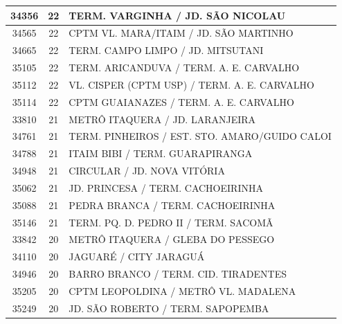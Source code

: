 \documentclass[
	12pt,				%
	oneside,			%
	a4paper,			%
	english,			%
	brazil				%
	]{abntex2ppgsi}
\begin{document}
\begin{apendicesenv}
\begin{longtable}{c|c|p{7cm}}
    34356 & 22    & TERM. VARGINHA / JD. SÃO NICOLAU \\
\hline

    34565 & 22    & CPTM VL. MARA/ITAIM / JD. SÃO MARTINHO \\
\hline

    34665 & 22    & TERM. CAMPO LIMPO / JD. MITSUTANI \\
\hline

    35105 & 22    & TERM. ARICANDUVA / TERM. A. E. CARVALHO \\
\hline

    35112 & 22    & VL. CISPER (CPTM USP) / TERM. A. E. CARVALHO \\
\hline

    35114 & 22    & CPTM GUAIANAZES / TERM. A. E. CARVALHO \\
\hline

    33810 & 21    & METRÔ ITAQUERA / JD. LARANJEIRA \\
\hline

    34761 & 21    & TERM. PINHEIROS / EST. STO. AMARO/GUIDO CALOI \\
\hline

    34788 & 21    & ITAIM BIBI / TERM. GUARAPIRANGA \\
\hline

    34948 & 21    & CIRCULAR / JD. NOVA VITÓRIA \\
\hline

    35062 & 21    & JD. PRINCESA / TERM. CACHOEIRINHA \\
\hline

    35088 & 21    & PEDRA BRANCA / TERM. CACHOEIRINHA \\
\hline

    35146 & 21    & TERM. PQ. D. PEDRO II / TERM. SACOMÃ \\
\hline

    33842 & 20    & METRÔ ITAQUERA / GLEBA DO PESSEGO \\
\hline

    34110 & 20    & JAGUARÉ / CITY JARAGUÁ \\
\hline

    34946 & 20    & BARRO BRANCO / TERM. CID. TIRADENTES \\
\hline

    35205 & 20    & CPTM LEOPOLDINA / METRÔ VL. MADALENA \\
\hline

    35249 & 20    & JD. SÃO ROBERTO / TERM. SAPOPEMBA \\
\hline


\end{longtable}
\end{apendicesenv}
\end{document}
